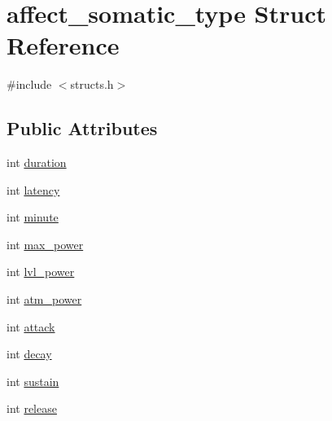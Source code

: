 \hypertarget{structaffect__somatic__type}{\section{affect\-\_\-somatic\-\_\-type Struct Reference}
\label{structaffect__somatic__type}
}


{\ttfamily \#include $<$structs.\-h$>$}

\subsection*{Public Attributes}
\begin{DoxyCompactItemize}
\item 
int \hyperlink{structaffect__somatic__type_aee016558f55f5fe0a773abe53560047e}{duration}
\item 
int \hyperlink{structaffect__somatic__type_a12cc96a1664328193285d2abca98e710}{latency}
\item 
int \hyperlink{structaffect__somatic__type_adaf58207c1b56a0e8823036841c1419f}{minute}
\item 
int \hyperlink{structaffect__somatic__type_acb822cbd55a806e6a8b6f4bb6fcc21fa}{max\-\_\-power}
\item 
int \hyperlink{structaffect__somatic__type_abb1467170e16a1517a074614c1d86991}{lvl\-\_\-power}
\item 
int \hyperlink{structaffect__somatic__type_ac1f92f8401a14b8273e6fca0c423d1b3}{atm\-\_\-power}
\item 
int \hyperlink{structaffect__somatic__type_ae49070ec3647f8d4f1c628686d71256b}{attack}
\item 
int \hyperlink{structaffect__somatic__type_a94413a57fd94c620d6d97014fba3222e}{decay}
\item 
int \hyperlink{structaffect__somatic__type_ae41a284f123fac114c48d18c95a036ae}{sustain}
\item 
int \hyperlink{structaffect__somatic__type_a97e8678e479146a2d5d793d54ca919b4}{release}
\end{DoxyCompactItemize}


